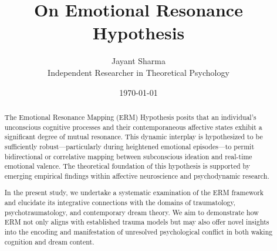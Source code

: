 \documentclass[9pt]{article}
\title{On Emotional Resonance Hypothesis}
\author{Jayant Sharma\\
\small Independent Researcher in Theoretical Psychology}
\date{\today}
\begin{document}
\maketitle

\begin{abstract}
The Emotional Resonance Mapping (ERM) Hypothesis posits that an individual’s unconscious cognitive processes and their contemporaneous affective states exhibit a significant degree of mutual resonance. This dynamic interplay is hypothesized to be sufficiently robust—particularly during heightened emotional episodes—to permit bidirectional or correlative mapping between subconscious ideation and real-time emotional valence. The theoretical foundation of this hypothesis is supported by emerging empirical findings within affective neuroscience and psychodynamic research.

In the present study, we undertake a systematic examination of the ERM framework and elucidate its integrative connections with the domains of traumatology, psychotraumatology, and contemporary dream theory. We aim to demonstrate how ERM not only aligns with established trauma models but may also offer novel insights into the encoding and manifestation of unresolved psychological conflict in both waking cognition and dream content.
\end{abstract}





\end{document}
